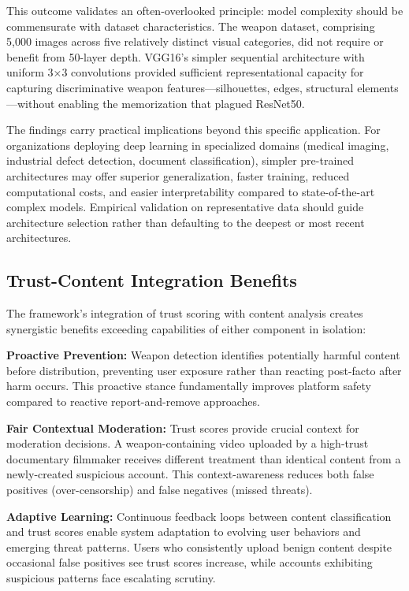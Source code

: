 \documentclass[conference]{IEEEtran}
\begin{document}
This outcome validates an often-overlooked principle: model complexity should be commensurate with dataset characteristics. The weapon dataset, comprising 5,000 images across five relatively distinct visual categories, did not require or benefit from 50-layer depth. VGG16's simpler sequential architecture with uniform 3×3 convolutions provided sufficient representational capacity for capturing discriminative weapon features—silhouettes, edges, structural elements—without enabling the memorization that plagued ResNet50.

The findings carry practical implications beyond this specific application. For organizations deploying deep learning in specialized domains (medical imaging, industrial defect detection, document classification), simpler pre-trained architectures may offer superior generalization, faster training, reduced computational costs, and easier interpretability compared to state-of-the-art complex models. Empirical validation on representative data should guide architecture selection rather than defaulting to the deepest or most recent architectures.

\subsection{Trust-Content Integration Benefits}

The framework's integration of trust scoring with content analysis creates synergistic benefits exceeding capabilities of either component in isolation:

\textbf{Proactive Prevention:} Weapon detection identifies potentially harmful content before distribution, preventing user exposure rather than reacting post-facto after harm occurs. This proactive stance fundamentally improves platform safety compared to reactive report-and-remove approaches.

\textbf{Fair Contextual Moderation:} Trust scores provide crucial context for moderation decisions. A weapon-containing video uploaded by a high-trust documentary filmmaker receives different treatment than identical content from a newly-created suspicious account. This context-awareness reduces both false positives (over-censorship) and false negatives (missed threats).

\textbf{Adaptive Learning:} Continuous feedback loops between content classification and trust scores enable system adaptation to evolving user behaviors and emerging threat patterns. Users who consistently upload benign content despite occasional false positives see trust scores increase, while accounts exhibiting suspicious patterns face escalating scrutiny.
\end{document}
